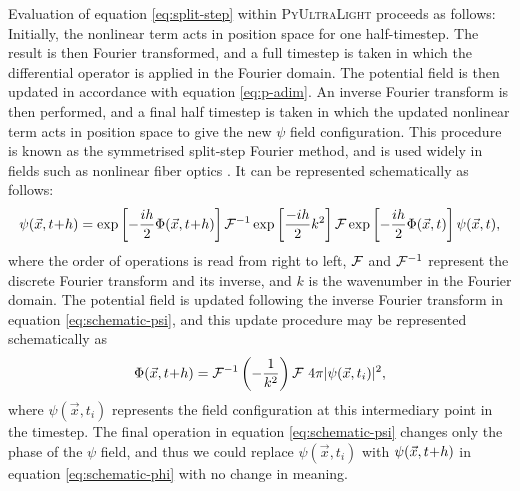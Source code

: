 \documentclass[a4paper,11pt]{article}
\newcommand{\PyUltraLight}{\textsc{PyUltraLight }}
\begin{document}
Evaluation of equation \ref{eq:split-step} within \PyUltraLight proceeds as follows:
Initially, the nonlinear term acts in position space for one half-timestep. The result is then Fourier transformed, and a full timestep is taken in which the differential operator is applied in the Fourier domain. The potential field is then updated in accordance with equation \ref{eq:p-adim}. An inverse Fourier transform is then performed, and a final half timestep is taken in which the updated nonlinear term acts in position space to give the new $\psi$ field configuration. This procedure is known as the symmetrised split-step Fourier method, and is used widely in fields such as nonlinear fiber optics \cite{Agrawal2013}. It can be represented schematically as follows:
\begin{equation}\label{eq:schematic-psi}
    \psi(\vec{x},t\hspace*{-.2em}+\hspace*{-.2em}h)=\operatorname{exp}\left[-\frac{ih}{2}\Phi(\vec{x},t\hspace*{-.2em}+\hspace*{-.2em}h)\right]\CMcal{F}^{-1} \operatorname{exp}\left[\frac{-ih}{2}k^2\right]\CMcal{F}\operatorname{exp}\left[-\frac{ih}{2}\Phi(\vec{x},t)\right]\psi(\vec{x},t),
\end{equation}
where the order of operations is read from right to left, $\CMcal{F}$ and $\CMcal{F}^{-1}$ represent the discrete Fourier transform and its inverse, and $k$ is the wavenumber in the Fourier domain. The potential field is updated following the inverse Fourier transform in equation \ref{eq:schematic-psi}, and this update procedure may be represented schematically as
\begin{equation}\label{eq:schematic-phi}
    \Phi(\vec{x},t\hspace*{-.2em}+\hspace*{-.2em}h)=\CMcal{F}^{-1}\left(-\frac{1}{k^2}\right)\CMcal{F}\ 4\pi\vert\psi(\vec{x},t_{i})\vert^2,
\end{equation}
where $\psi(\vec{x},t_{i})$ represents the field configuration at this intermediary point in the timestep. The final operation in equation \ref{eq:schematic-psi} changes only the phase of the $\psi$ field, and thus we could replace $\psi(\vec{x},t_{i})$ with $\psi(\vec{x},t\hspace*{-.2em}+\hspace*{-.2em}h)$ in equation \ref{eq:schematic-phi} with no change in meaning. 
\end{document}
